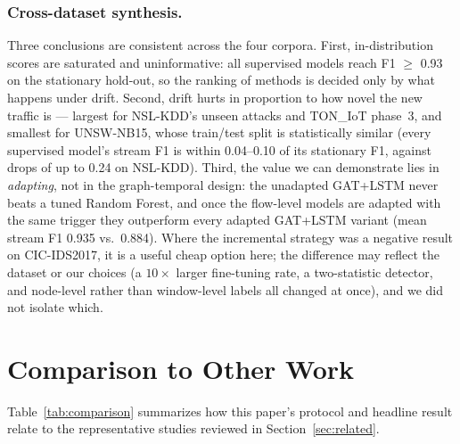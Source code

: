 \documentclass[twocolumn]{llncs}
\begin{document}
\subsubsection{Cross-dataset synthesis.} Three conclusions are consistent across the four corpora.
First, in-distribution scores are saturated and uninformative: all supervised models reach
F1 $\ge$ 0.93 on the stationary hold-out, so the ranking of methods is decided only by what happens
under drift. Second, drift hurts in proportion to how novel the new traffic is --- largest for
NSL-KDD's unseen attacks and TON\_IoT phase~3, and smallest for UNSW-NB15, whose train/test split is
statistically similar (every supervised model's stream F1 is within 0.04--0.10 of its stationary
F1, against drops of up to 0.24 on NSL-KDD). Third, the value we can demonstrate lies in \emph{adapting}, not in the graph-temporal design: the
unadapted GAT+LSTM never beats a tuned Random Forest, and once the flow-level models are adapted
with the same trigger they outperform every adapted GAT+LSTM variant (mean stream F1 0.935 vs.\ 0.884). Where the incremental strategy was a
negative result on CIC-IDS2017, it is a useful cheap option here; the difference may reflect the
dataset or our choices (a $10\times$ larger fine-tuning rate, a two-statistic detector, and
node-level rather than window-level labels all changed at once), and we did not isolate which.

\section{Comparison to Other Work}
\label{sec:discussion}

Table~\ref{tab:comparison} summarizes how this paper's protocol and headline result relate to the
representative studies reviewed in Section~\ref{sec:related}.
\end{document}
